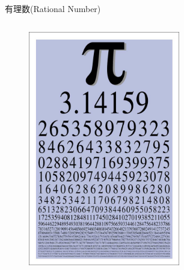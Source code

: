 \begin{frame}[c]{有理数(Rational Number)}
\begin{columns}
{\begin{figure}
                    \includegraphics[width=0.59\textwidth]{assets/pi number.jpg}
                \end{figure}
                
            }
        \end{columns}
        
    \end{frame}

